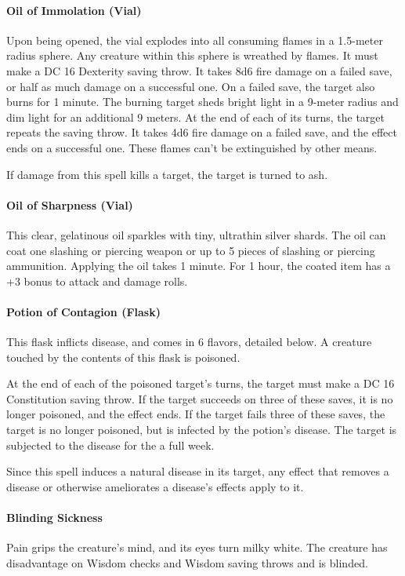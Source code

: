 \paragraph{Oil of Immolation (Vial)} %
    Upon being opened, the vial explodes into all consuming flames in a 1.5-meter radius sphere.
    Any creature within this sphere is wreathed by flames.
    It must make a DC 16 Dexterity saving throw.
    It takes 8d6 fire damage on a failed save, or half as much damage on a successful one.
    On a failed save, the target also burns for 1 minute.
    The burning target sheds bright light in a 9-meter radius and dim light for an additional 9 meters.
    At the end of each of its turns, the target repeats the saving throw.
    It takes 4d6 fire damage on a failed save, and the effect ends on a successful one.
    These flames can't be extinguished by other means.

    If damage from this spell kills a target, the target is turned to ash.
\paragraph{Oil of Sharpness (Vial)}
    This clear, gelatinous oil sparkles with tiny, ultrathin silver shards.
    The oil can coat one slashing or piercing weapon or up to 5 pieces of slashing or piercing ammunition.
    Applying the oil takes 1 minute.
    For 1 hour, the coated item has a +3 bonus to attack and damage rolls.
\paragraph{Potion of Contagion (Flask)} %
    This flask inflicts disease, and comes in 6 flavors, detailed below.
    A creature touched by the contents of this flask is poisoned.

    At the end of each of the poisoned target's turns, the target must make a DC 16 Constitution saving throw.
    If the target succeeds on three of these saves, it is no longer poisoned, and the effect ends.
    If the target fails three of these saves, the target is no longer poisoned, but is infected by the potion's disease.
    The target is subjected to the disease for the a full week.

    Since this spell induces a natural disease in its target, any effect that removes a disease or otherwise ameliorates a disease's effects apply to it.

    \paragraph{Blinding Sickness} Pain grips the creature's mind, and its eyes turn milky white.
    The creature has disadvantage on Wisdom checks and Wisdom saving throws and is blinded.

